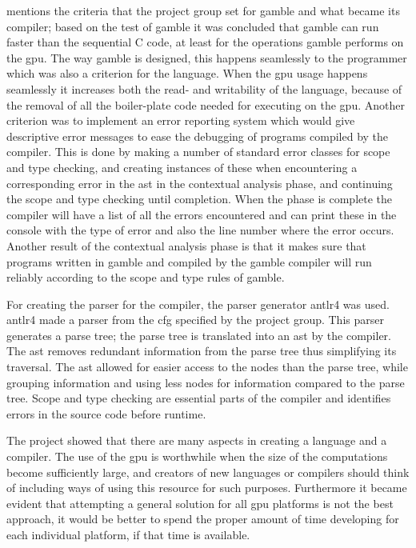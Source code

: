  mentions the criteria that the project group set for \gls{gamble} and what became its compiler; based on the test of \gls{gamble} it was concluded that \gls{gamble} can run faster than the sequential C code, at least for the operations \gls{gamble} performs on the \acrshort{gpu}.
The way \gls{gamble} is designed, this happens seamlessly to the programmer which was also a criterion for the language.
When the \acrshort{gpu} usage happens seamlessly it increases both the read- and writability of the language, because of the removal of all the boiler-plate code needed for executing on the \acrshort{gpu}.
Another criterion was to implement an error reporting system which would give descriptive error messages to ease the debugging of programs compiled by the compiler.
This is done by making a number of standard error classes for scope and type checking, and creating instances of these when encountering a corresponding error in the \acrshort{ast} in the contextual analysis phase, and continuing the scope and type checking until completion.
When the phase is complete the compiler will have a list of all the errors encountered and can print these in the console with the type of error and also the line number where the error occurs.
Another result of the contextual analysis phase is that it makes sure that programs written in \gls{gamble} and compiled by the \gls{gamble} compiler will run reliably according to the scope and type rules of \gls{gamble}.

For creating the parser for the compiler, the parser generator \acrshort{antlr}4 was used.
\acrshort{antlr}4 made a parser from the \acrshort{cfg} specified by the project group.
This parser generates a parse tree; the parse tree is translated into an \acrshort{ast} by the compiler.
The \acrshort{ast} removes redundant information from the parse tree thus simplifying its traversal.
The \acrshort{ast} allowed for easier access to the nodes than the parse tree, while grouping information and using less nodes for information compared to the parse tree.
Scope and type checking are essential parts of the compiler and identifies errors in the source code before runtime.

The project showed that there are many aspects in creating a language and a compiler.
The use of the \acrshort{gpu} is worthwhile when the size of the computations become sufficiently large, and creators of new languages or compilers should think of including ways of using this resource for such purposes.
Furthermore it became evident that attempting a general solution for all \acrshort{gpu} platforms is not the best approach, it would be better to spend the proper amount of time developing for each individual platform, if that time is available.

